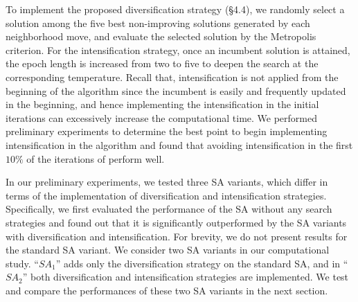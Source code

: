 \documentclass[11pt]{article}
\begin{document}
To implement the proposed diversification strategy (\S 4.4), we randomly select a solution among the five best non-improving solutions generated by each neighborhood move, and evaluate the selected solution by the Metropolis criterion. For the intensification strategy, once an incumbent solution is attained, the epoch length is increased from two to five to deepen the search at the corresponding temperature. Recall that, intensification is not applied from the beginning of the algorithm since the incumbent is easily and frequently updated in the beginning, and hence implementing the intensification in the initial iterations can excessively increase the computational time. We performed preliminary experiments to determine the best point to begin implementing intensification in the algorithm and found that avoiding intensification in the first $10\%$ of the iterations of perform well. 


In our preliminary experiments, we tested three SA variants, which differ in terms of the implementation of diversification and intensification strategies. Specifically, we first evaluated the performance of the SA without any search strategies and found out that it is significantly outperformed by the SA variants with diversification and intensification. For brevity, we do not present results for the standard SA variant. We consider two SA variants in our computational study. ``$SA_{1}$'' adds only the diversification strategy on the standard SA, and in ``$SA_{2}$'' both diversification and intensification strategies are implemented. We test and compare the performances of these two SA variants in the next section. 
\end{document}
